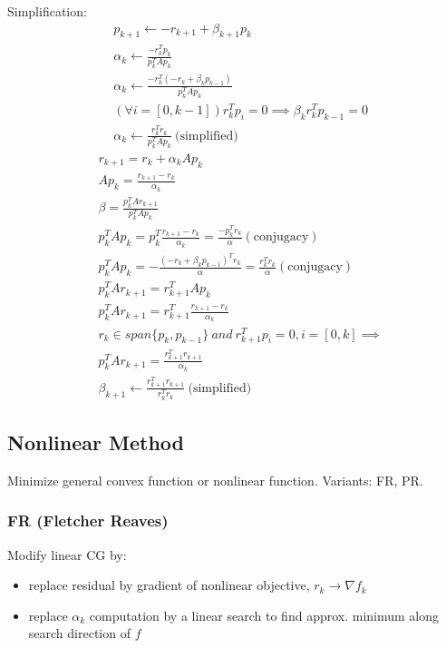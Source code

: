 \documentclass[8pt,letter]{article}
\begin{document}
\begin{multicols*}{2}
  \vfill\null
  \columnbreak
  
  Simplification:
  \begin{align*}
    &p_{k+1} \leftarrow -r_{k+1} + \beta_{k+1} p_k\\
    &\alpha_k \leftarrow \frac{-r_k^Tp_k}{p_k^T A p_k}\\
    &\alpha_k \leftarrow \frac{-r_k^T(-r_{k} + \beta_{k} p_{k-1})}{p_k^T A p_k}\\
    &(\forall i=[0,k-1]) r_k^T p_i=0 \implies \beta_k r_k^T p_{k-1}=0\\
    &\alpha_k \leftarrow \frac{r_k^T r_k}{p_k^T A p_k} \ \text{(simplified)}
  \end{align*}
  \begin{align*}
    &r_{k+1}=r_k+\alpha_k A p_k\\
    &A p_k = \frac{r_{k+1}-r_k}{\alpha_k}\\
    &\beta = \frac{p_k^T A r_{k+1}}{p_k^T A p_k}\\
    &p_k^T A p_k = p_k^T \frac{r_{k+1}-r_k}{\alpha_k}= \frac{-p_k^T r_k}{\alpha} (\text{conjugacy})\\
    &p_k^T A p_k = -\frac{(- r_k + \beta_k p_{k-1})^T r_k}{\alpha}=\frac{r_k^T r_k}{\alpha} (\text{conjugacy})\\
    &p_k^T A r_{k+1} = r_{k+1}^T A p_k\\
    &p_k^T A r_{k+1} = r_{k+1}^T \frac{r_{k+1}-r_k}{\alpha_k}\\
    &r_k \in span\{p_k,p_{k-1}\}\ and\ r_{k+1}^T p_i = 0, i=[0,k] \implies\\
    &p_k^T A r_{k+1} = \frac{r_{k+1}^T r_{k+1}}{\alpha_k}\\
    &\beta_{k+1} \leftarrow \frac{r_{k+1}^T r_{k+1}}{r_k^T r_k} \ \text{(simplified)}
  \end{align*}

  \subsection{Nonlinear Method}
  Minimize general convex function or nonlinear function. Variants: FR, PR.

  \subsubsection{FR (Fletcher Reaves)}
  Modify linear CG by:
  \begin{itemize}
  \item replace residual by gradient of nonlinear objective, $r_k \rightarrow \nabla f_k$
  \item replace $\alpha_k$ computation by a linear search to find approx. minimum along search direction of $f$
  \end{itemize}


\end{multicols*}
\end{document}

